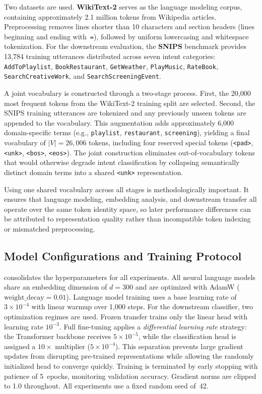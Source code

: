 \documentclass[10pt,a4paper]{article}
\begin{document}
Two datasets are used. \textbf{WikiText-2} serves as the language modeling corpus, containing approximately 2.1 million tokens from Wikipedia articles. Preprocessing removes lines shorter than 10 characters and section headers (lines beginning and ending with~\texttt{=}), followed by uniform lowercasing and whitespace tokenization. For the downstream evaluation, the \textbf{SNIPS} benchmark provides 13{,}784 training utterances distributed across seven intent categories: \texttt{AddToPlaylist}, \texttt{BookRestaurant}, \texttt{GetWeather}, \texttt{PlayMusic}, \texttt{RateBook}, \texttt{SearchCreativeWork}, and \texttt{SearchScreeningEvent}.

A joint vocabulary is constructed through a two-stage process. First, the 20{,}000 most frequent tokens from the WikiText-2 training split are selected. Second, the SNIPS training utterances are tokenized and any previously unseen tokens are appended to the vocabulary. This augmentation adds approximately 6{,}000 domain-specific terms (e.g., \texttt{playlist}, \texttt{restaurant}, \texttt{screening}), yielding a final vocabulary of $|V| = 26{,}006$ tokens, including four reserved special tokens (\texttt{<pad>}, \texttt{<unk>}, \texttt{<bos>}, \texttt{<eos>}). The joint construction eliminates out-of-vocabulary tokens that would otherwise degrade intent classification by collapsing semantically distinct domain terms into a shared \texttt{<unk>} representation.

Using one shared vocabulary across all stages is methodologically important. It ensures that language modeling, embedding analysis, and downstream transfer all operate over the same token identity space, so later performance differences can be attributed to representation quality rather than incompatible token indexing or mismatched preprocessing.

\subsection{Model Configurations and Training Protocol}
\label{sec:config}

 consolidates the hyperparameters for all experiments. All neural language models share an embedding dimension of $d = 300$ and are optimized with AdamW ($\text{weight\_decay} = 0.01$). Language model training uses a base learning rate of $3 \times 10^{-4}$ with linear warmup over 1{,}000 steps. For the downstream classifier, two optimization regimes are used. Frozen transfer trains only the linear head with learning rate $10^{-3}$. Full fine-tuning applies a \emph{differential learning rate} strategy: the Transformer backbone receives $5 \times 10^{-5}$, while the classification head is assigned a $10\times$ multiplier ($5 \times 10^{-4}$). This separation prevents large gradient updates from disrupting pre-trained representations while allowing the randomly initialized head to converge quickly. Training is terminated by early stopping with patience of 5~epochs, monitoring validation accuracy. Gradient norms are clipped to 1.0 throughout. All experiments use a fixed random seed of~42.
\end{document}
